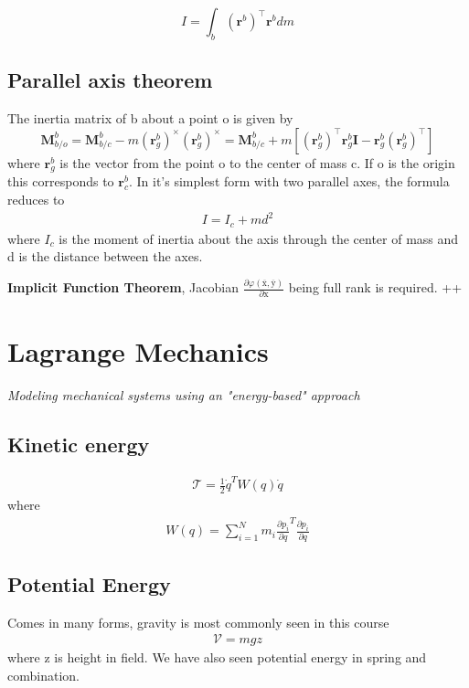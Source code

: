 \begin{equation}
    I = \int_{b} (\mathbf{r}^b)^\top \mathbf{r}^b dm
\end{equation}

\subsection{Parallel axis theorem}
The inertia matrix of b about a point o is given by 
\begin{equation}
    \mathbf{M}_{b/o}^b = \mathbf{M}_{b/c}^b - m (\mathbf{r}_g^b)^\times (\mathbf{r}_g^b)^\times =
    \mathbf{M}_{b/c}^b + m\left[ (\mathbf{r}_g^b)^\top \mathbf{r}_g^b \mathbf{I} - \mathbf{r}_g^b (\mathbf{r}_g^b)^\top \right]
\end{equation}
where $\mathbf{r}_g^b$ is the vector from the point o to the center of mass c. If o is the origin this corresponds to $\mathbf{r}_c^b$. In it's simplest form with two parallel axes, the formula reduces to 
\begin{align}
    I = I_c + md^2
\end{align}
where $I_c$ is the moment of inertia about the axis through the center of mass and d is the distance between the axes. 

\textbf{Implicit Function Theorem}, Jacobian $\frac{\partial \varphi(\overline{\mathrm{x}}, \overline{\mathrm{y}})}{\partial \mathrm{x}}$ being full rank is required. ++


\section{Lagrange Mechanics}
\textit{Modeling mechanical systems using an "energy-based" approach}
\subsection{Kinetic energy}
\begin{align}
    \mathcal{T} = \frac{1}{2}\Dot{q}^TW(q)\Dot{q}
\end{align}
where
\begin{align}
    W(q) = \sum_{i=1}^Nm_i\frac{\partial p_i}{\partial q}^T\frac{\partial p_i}{\partial q}
\end{align}

\subsection{Potential Energy}
Comes in many forms, gravity is most commonly seen in this course
\begin{align}
    \mathcal{V} = mgz
\end{align}
where z is height in field. We have also seen potential energy in spring and combination.

